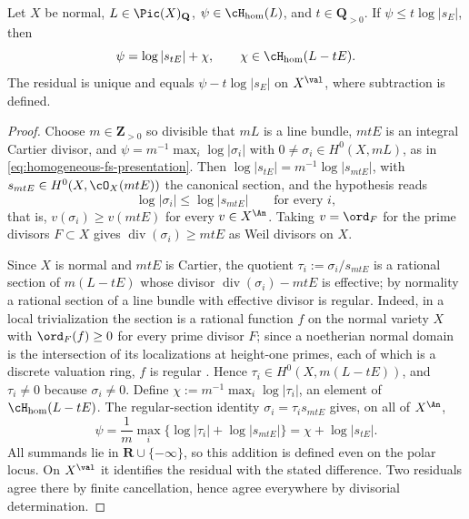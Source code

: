 \begin{lemma}
\label{lem:ch35-fs-division}
Let $X$ be normal, $L\in\Pic(X)_{\mathbf Q}$,
$\psi\in\cH_{\mathrm{hom}}(L)$, and $t\in\mathbf Q_{>0}$.  If
$\psi\leq t\log|s_E|$, then
\begin{equation}
\label{eq:ch35-fs-division}
 \psi=\log|s_{tE}|+\chi,
 \qquad\chi\in\cH_{\mathrm{hom}}(L-tE).
\end{equation}
The residual is unique and equals $\psi-t\log|s_E|$ on $X^{\val}$,
where subtraction is defined.
\end{lemma}

\begin{proof}
Choose $m\in\mathbf Z_{>0}$ so divisible that $mL$ is a line bundle,
$mtE$ is an integral Cartier divisor, and
$\psi=m^{-1}\max_i\log|\sigma_i|$ with
$0\neq\sigma_i\in H^0(X,mL)$, as in
\eqref{eq:homogeneous-fs-presentation}.  Then
$\log|s_{tE}|=m^{-1}\log|s_{mtE}|$, with
$s_{mtE}\in H^0(X,\cO_X(mtE))$ the canonical section, and the hypothesis
reads
\[
 \log|\sigma_i|\leq\log|s_{mtE}|\qquad\text{for every }i,
\]
that is, $v(\sigma_i)\geq v(mtE)$ for every $v\in X^{\An}$.  Taking
$v=\ord_F$ for the prime divisors $F\subset X$ gives
$\operatorname{div}(\sigma_i)\geq mtE$ as Weil divisors on $X$.

Since $X$ is normal and $mtE$ is Cartier, the quotient
$\tau_i:=\sigma_i/s_{mtE}$ is a rational section of
$m(L-tE)$ whose divisor $\operatorname{div}(\sigma_i)-mtE$ is effective;
by normality a rational section of a line bundle with effective divisor is
regular.  Indeed, in a local trivialization the section is a rational
function $f$ on the normal variety $X$ with
$\ord_F(f)\geq0$ for every prime divisor $F$; since a noetherian normal
domain is the intersection of its localizations at height-one primes, each
of which is a discrete valuation ring, $f$ is regular
\cite[Proposition~II.6.3A]{Har}.  Hence
$\tau_i\in H^0(X,m(L-tE))$, and $\tau_i\neq0$ because
$\sigma_i\neq0$.  Define $\chi:=m^{-1}\max_i\log|\tau_i|$, an element of
$\cH_{\mathrm{hom}}(L-tE)$. The regular-section identity
$\sigma_i=\tau_i s_{mtE}$ gives, on all of $X^{\An}$,
\[
 \psi=\frac1m\max_i\{\log|\tau_i|+\log|s_{mtE}|\}
 =\chi+\log|s_{tE}|.
\]
All summands lie in $\mathbf R\cup\{-\infty\}$, so this addition is
defined even on the polar locus. On $X^{\val}$ it identifies the residual
with the stated difference. Two residuals agree there by finite
cancellation, hence agree everywhere by divisorial determination.
\end{proof}

